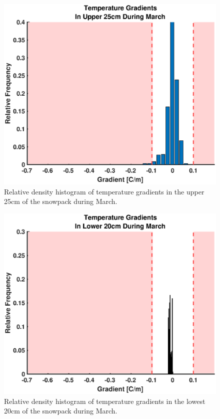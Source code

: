    \begin{figure}[H]
    \centering
    \includegraphics[width=0.7\linewidth]{figures/TempGrad/Mar_U25_RDH.eps}
    \caption{Relative density histogram of temperature gradients in the upper 25cm of the snowpack during March.}
    \label{fig:Mar_U25_RDH}
 \end{figure}
 
   \begin{figure}[H]
    \centering
    \includegraphics[width=0.7\linewidth]{figures/TempGrad/Mar_L20_RDH.eps}
    \caption{Relative density histogram of temperature gradients in the lowest 20cm of the snowpack during March.}
    \label{fig:Mar_L20_RDH}
 \end{figure}

